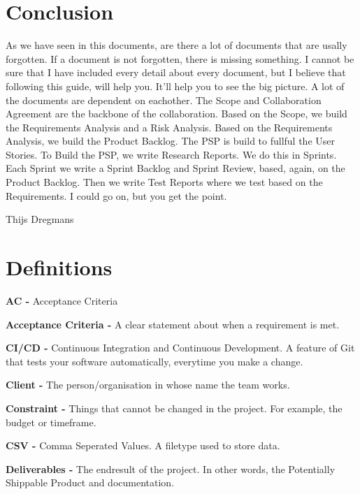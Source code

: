 \documentclass[10pt]{report}
\begin{document}
\newpage

\chapter{Conclusion}
\thispagestyle{fancy}

As we have seen in this documents, are there a lot of documents that are usally forgotten. If a document is not forgotten, there is missing something. I cannot be sure that I have included every detail about every document, but I believe that following this guide, will help you. It'll help you to see the big picture. A lot of the documents are dependent on eachother. The Scope and Collaboration Agreement are the backbone of the collaboration. Based on the Scope, we build the Requirements Analysis and a Risk Analysis. Based on the Requirements Analysis, we build the Product Backlog. The PSP is build to fullful the User Stories. To Build the PSP, we write Research Reports. We do this in Sprints. Each Sprint we write a Sprint Backlog and Sprint Review, based, again, on the Product Backlog. Then we write Test Reports where we test based on the Requirements. I could go on, but you get the point.

\bigskip

Thijs Dregmans


\chapter{Definitions}
\thispagestyle{fancy}

\noindent\textbf{AC -} Acceptance Criteria

\noindent\textbf{Acceptance Criteria -} A clear statement about when a requirement is met. 

\noindent\textbf{CI/CD -} Continuous Integration and Continuous Development. A feature of Git that tests your software automatically, everytime you make a change.

\noindent\textbf{Client -} The person/organisation in whose name the team works.

\noindent\textbf{Constraint -} Things that cannot be changed in the project. For example, the budget or timeframe.

\noindent\textbf{CSV -} Comma Seperated Values. A filetype used to store data.

\noindent\textbf{Deliverables -} The endresult of the project. In other words, the Potentially Shippable Product and documentation.
\end{document}
